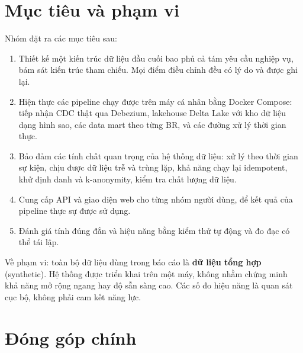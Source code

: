 \section{Mục tiêu và phạm vi}

Nhóm đặt ra các mục tiêu sau:
\begin{enumerate}
  \item Thiết kế một kiến trúc dữ liệu đầu cuối bao phủ cả tám yêu cầu nghiệp vụ, bám sát kiến trúc tham chiếu. Mọi điểm điều chỉnh đều có lý do và được ghi lại.
  \item Hiện thực các pipeline chạy được trên máy cá nhân bằng Docker Compose: tiếp nhận CDC thật qua Debezium, lakehouse Delta Lake với kho dữ liệu dạng hình sao, các data mart theo từng BR, và các đường xử lý thời gian thực.
  \item Bảo đảm các tính chất quan trọng của hệ thống dữ liệu: xử lý theo thời gian sự kiện, chịu được dữ liệu trễ và trùng lặp, khả năng chạy lại idempotent, khử định danh và k-anonymity, kiểm tra chất lượng dữ liệu.
  \item Cung cấp API và giao diện web cho từng nhóm người dùng, để kết quả của pipeline thực sự được sử dụng.
  \item Đánh giá tính đúng đắn và hiệu năng bằng kiểm thử tự động và đo đạc có thể tái lập.
\end{enumerate}

Về phạm vi: toàn bộ dữ liệu dùng trong báo cáo là \textbf{dữ liệu tổng hợp} (synthetic). Hệ thống được triển khai trên một máy, không nhằm chứng minh khả năng mở rộng ngang hay độ sẵn sàng cao. Các số đo hiệu năng là quan sát cục bộ, không phải cam kết năng lực.

\section{Đóng góp chính}

